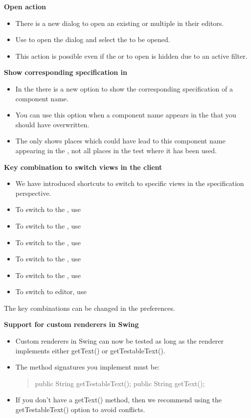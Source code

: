 \textbf{Open \gdcase{} action}
\begin{itemize}
\item There is a new dialog to open an existing \gdcase{} or multiple \gdcases{} in their editors.
\item Use  to open the dialog and select the \gdcases{} to be opened.
\item This action is possible even if the \gdcase{} or \gdsuite{} to open is hidden due to an active filter. 
\end{itemize}


\textbf{Show corresponding specification in \gdomeditor{}}
\begin{itemize}
\item In the \gdomeditor{} there is a new option to show the corresponding specification of a component name.
\item You can use this option when a component name appears in the \gdomeditor{} that you should have overwritten. 
\item The \gdsearchresultview{} only shows places which could have lead to this component name appearing in the \gdomeditor{}, not all places in the test where it has been used.
\end{itemize}

\textbf{Key combination to switch views in the client}
\begin{itemize}
\item We have introduced shortcuts to switch to specific views in the specification perspective.
\item To switch to the \gdtestsuitebrowser{}, use 
\item To switch to the \gdtestcasebrowser{}, use 
\item To switch to the \gdpropview{}, use 
\item To switch to the \gddatasetsview{}, use 
\item To switch to the \gdcompnamesview{}, use 
\item To switch to editor, use 
\end{itemize}
The key combinations can be changed in the preferences. 

\textbf{Support for custom renderers in Swing}
\begin{itemize}
\item Custom renderers in Swing \gdauts{} can now be tested as long as the renderer implements either getText() or getTestableText(). 
\item The method signatures you implement must be:
\begin{quote}
public String getTestableText();
public String getText();
\end{quote}
\item If you don't have a getText() method, then we recommend using the getTestableText() option to avoid conflicts. 
\end{itemize}

